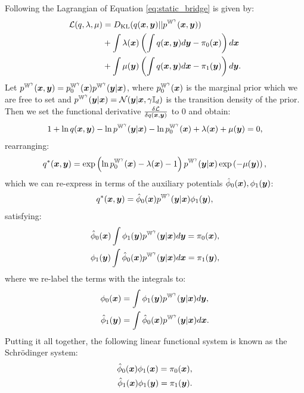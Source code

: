 \documentclass[a4paper,12pt,twoside,openright]{report}
\theoremstyle{definition}
\begin{document}
Following \cite{pavon2018data} the Lagrangian of Equation \ref{eq:static_bridge} is given by:
\begin{align}\label{eq:schro_lagrangian}
    {\mathcal{L}}(q, \lambda,  \mu) &=  D_{\mathrm{KL}} (q({\bm{x}},{\bm{y}})  || p^{\mathbb{W}^{\gamma}}({\bm{x}},{\bm{y}}))  \nonumber\\
    &+ \int \lambda({\bm{x}})\left( \int q({\bm{x}},{\bm{y}})d{\bm{y}} -\pi_0({\bm{x}})\right)d{\bm{x}} \nonumber \\
    &+ \int \mu({\bm{y}}) \left(\int q({\bm{x}},{\bm{y}}) d{\bm{x}} - \pi_1({\bm{y}})\right) d{\bm{y}}.
\end{align}
Let $p^{\mathbb{W}^{\gamma}}({\bm{x}},{\bm{y}}) = p^{\mathbb{W}^{\gamma}}_0({\bm{x}})p^{\mathbb{W}^{\gamma}}({\bm{y}}|{\bm{x}})$, where $p^{\mathbb{W}^{\gamma}}_0({\bm{x}})$ is the marginal prior which we are free to set and $p^{\mathbb{W}^{\gamma}}({\bm{y}}|{\bm{x}})={\mathcal{N}}({\bm{y}} | {\bm{x}}, \gamma{\mathbb{I}_d})$ is the transition density of the prior. Then we set the functional derivative $\frac{\delta {\mathcal{L}}}{\delta q({\bm{x}}, {\bm{y}})}$ to 0 and obtain:
\begin{align*}
    1 + \ln q({\bm{x}}, {\bm{y}})  - \ln p^{\mathbb{W}^{\gamma}}({\bm{y}}|{\bm{x}})
    - \ln p^{\mathbb{W}^{\gamma}}_0({\bm{x}})+ \lambda({\bm{x}})
+ \mu({\bm{y}}) = 0, \nonumber
\end{align*}
rearranging:
\begin{align*}
{q^{*}({\bm{x}}, {\bm{y}}) }  = \exp\left(  \ln p^{\mathbb{W}^{\gamma}}_0({\bm{x}}) -\lambda({\bm{x}}) -1\right)p^{\mathbb{W}^{\gamma}}({\bm{y}}|{\bm{x}})\exp\left(- \mu({\bm{y}})\right) ,\nonumber
\end{align*}
which we can re-express in terms of the auxiliary potentials ${\hat{\phi}}_0({\bm{x}}), \phi_1({\bm{y}})$:
\begin{align*}
{q^{*}({\bm{x}}, {\bm{y}}) }  = {\hat{\phi}}_0({\bm{x}})p^{\mathbb{W}^{\gamma}}({\bm{y}}|{\bm{x}})\phi_1({\bm{y}}), \nonumber
\end{align*}
satisfying:
\begin{align}
    {\hat{\phi}}_0({\bm{x}}) \int \phi_1({\bm{y}}) p^{\mathbb{W}^{\gamma}}({\bm{y}}|{\bm{x}}) d{\bm{y}} = \pi_0({\bm{x}}) , \nonumber\\ 
    \phi_1({\bm{y}}) \int {\hat{\phi}}_0({\bm{x}}) p^{\mathbb{W}^{\gamma}}({\bm{y}}|{\bm{x}}) d{\bm{x}} = \pi_1({\bm{y}}), \nonumber
\end{align}
where we re-label the terms with the integrals to:
\begin{align} \label{eq:sysint}
    \phi_0({\bm{x}}) &= \int \phi_1({\bm{y}}) p^{\mathbb{W}^{\gamma}}({\bm{y}}|{\bm{x}}) d{\bm{y}}, \nonumber\\ 
    {\hat{\phi}}_1({\bm{y}}) &= \int {\hat{\phi}}_0({\bm{x}}) p^{\mathbb{W}^{\gamma}}({\bm{y}}|{\bm{x}}) d{\bm{x}}. \nonumber
\end{align}
Putting it all together, the following linear functional system is known as the Schrödinger system:
\begin{align}
    {\hat{\phi}}_0({\bm{x}}) \phi_1({\bm{x}})  = \pi_0({\bm{x}}),  \nonumber \\ 
    {\hat{\phi}}_1({\bm{x}}) \phi_1({\bm{y}})  = \pi_1({\bm{y}}).
\end{align}
\end{document}
